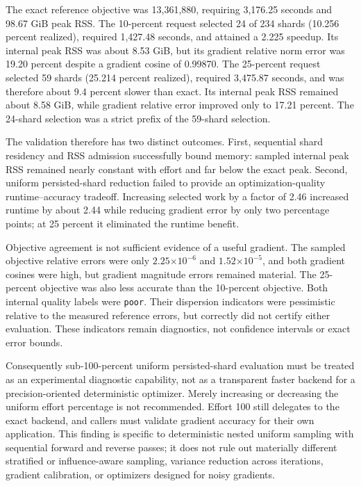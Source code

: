 The exact reference objective was 13,361,880, requiring 3,176.25 seconds and
98.67 GiB peak RSS.  The 10-percent request selected 24 of 234 shards
(10.256 percent realized), required 1,427.48 seconds, and attained a 2.225
speedup.  Its internal peak RSS was about 8.53 GiB, but its gradient relative
norm error was 19.20 percent despite a gradient cosine of 0.99870.  The
25-percent request selected 59 shards (25.214 percent realized), required
3,475.87 seconds, and was therefore about 9.4 percent slower than exact.  Its
internal peak RSS remained about 8.58 GiB, while gradient relative error
improved only to 17.21 percent.  The 24-shard selection was a strict prefix of
the 59-shard selection.

The validation therefore has two distinct outcomes.  First, sequential shard
residency and RSS admission successfully bound memory: sampled internal peak
RSS remained nearly constant with effort and far below the exact peak.  Second,
uniform persisted-shard reduction failed to provide an optimization-quality
runtime--accuracy tradeoff.  Increasing selected work by a factor of 2.46
increased runtime by about 2.44 while reducing gradient error by only two
percentage points; at 25 percent it eliminated the runtime benefit.

Objective agreement is not sufficient evidence of a useful gradient.  The
sampled objective relative errors were only
$2.25\mathord\times10^{-6}$ and $1.52\mathord\times10^{-5}$, and both gradient
cosines were high, but gradient magnitude errors remained material.  The
25-percent objective was also less accurate than the 10-percent objective.
Both internal quality labels were \texttt{poor}.  Their dispersion indicators
were pessimistic relative to the measured reference errors, but correctly did
not certify either evaluation.  These indicators remain diagnostics, not
confidence intervals or exact error bounds.

Consequently sub-100-percent uniform persisted-shard evaluation must be treated
as an experimental diagnostic capability, not as a transparent faster backend
for a precision-oriented deterministic optimizer.  Merely increasing or
decreasing the uniform effort percentage is not recommended.  Effort 100 still
delegates to the exact backend, and callers must validate gradient accuracy for
their own application.  This finding is specific to deterministic nested
uniform sampling with sequential forward and reverse passes; it does not rule
out materially different stratified or influence-aware sampling, variance
reduction across iterations, gradient calibration, or optimizers designed for
noisy gradients.

